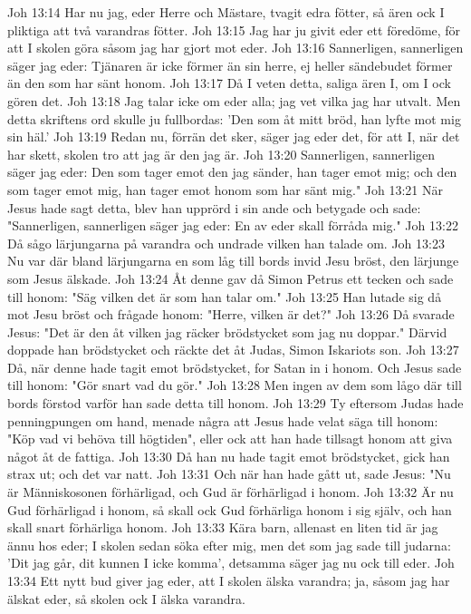 Joh 13:14  Har nu jag, eder Herre och Mästare, tvagit edra fötter, så ären ock I pliktiga att två varandras fötter.
Joh 13:15  Jag har ju givit eder ett föredöme, för att I skolen göra såsom jag har gjort mot eder.
Joh 13:16  Sannerligen, sannerligen säger jag eder: Tjänaren är icke förmer än sin herre, ej heller sändebudet förmer än den som har sänt honom.
Joh 13:17  Då I veten detta, saliga ären I, om I ock gören det.
Joh 13:18  Jag talar icke om eder alla; jag vet vilka jag har utvalt. Men detta skriftens ord skulle ju fullbordas: 'Den som åt mitt bröd, han lyfte mot mig sin häl.'
Joh 13:19  Redan nu, förrän det sker, säger jag eder det, för att I, när det har skett, skolen tro att jag är den jag är.
Joh 13:20  Sannerligen, sannerligen säger jag eder: Den som tager emot den jag sänder, han tager emot mig; och den som tager emot mig, han tager emot honom som har sänt mig."
Joh 13:21  När Jesus hade sagt detta, blev han upprörd i sin ande och betygade och sade: "Sannerligen, sannerligen säger jag eder: En av eder skall förråda mig."
Joh 13:22  Då sågo lärjungarna på varandra och undrade vilken han talade om.
Joh 13:23  Nu var där bland lärjungarna en som låg till bords invid Jesu bröst, den lärjunge som Jesus älskade.
Joh 13:24  Åt denne gav då Simon Petrus ett tecken och sade till honom: "Säg vilken det är som han talar om."
Joh 13:25  Han lutade sig då mot Jesu bröst och frågade honom: "Herre, vilken är det?"
Joh 13:26  Då svarade Jesus: "Det är den åt vilken jag räcker brödstycket som jag nu doppar." Därvid doppade han brödstycket och räckte det åt Judas, Simon Iskariots son.
Joh 13:27  Då, när denne hade tagit emot brödstycket, for Satan in i honom. Och Jesus sade till honom: "Gör snart vad du gör."
Joh 13:28  Men ingen av dem som lågo där till bords förstod varför han sade detta till honom.
Joh 13:29  Ty eftersom Judas hade penningpungen om hand, menade några att Jesus hade velat säga till honom: "Köp vad vi behöva till högtiden", eller ock att han hade tillsagt honom att giva något åt de fattiga.
Joh 13:30  Då han nu hade tagit emot brödstycket, gick han strax ut; och det var natt.
Joh 13:31  Och när han hade gått ut, sade Jesus: "Nu är Människosonen förhärligad, och Gud är förhärligad i honom.
Joh 13:32  Är nu Gud förhärligad i honom, så skall ock Gud förhärliga honom i sig själv, och han skall snart förhärliga honom.
Joh 13:33  Kära barn, allenast en liten tid är jag ännu hos eder; I skolen sedan söka efter mig, men det som jag sade till judarna: 'Dit jag går, dit kunnen I icke komma', detsamma säger jag nu ock till eder.
Joh 13:34  Ett nytt bud giver jag eder, att I skolen älska varandra; ja, såsom jag har älskat eder, så skolen ock I älska varandra.

